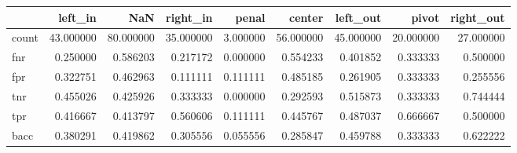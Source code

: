 \begin{tabular}{lrrrrrrrr}
\toprule
{} &    left\_in &        NaN &   right\_in &     penal &     center &   left\_out &      pivot &  right\_out \\
\midrule
count &  43.000000 &  80.000000 &  35.000000 &  3.000000 &  56.000000 &  45.000000 &  20.000000 &  27.000000 \\
fnr   &   0.250000 &   0.586203 &   0.217172 &  0.000000 &   0.554233 &   0.401852 &   0.333333 &   0.500000 \\
fpr   &   0.322751 &   0.462963 &   0.111111 &  0.111111 &   0.485185 &   0.261905 &   0.333333 &   0.255556 \\
tnr   &   0.455026 &   0.425926 &   0.333333 &  0.000000 &   0.292593 &   0.515873 &   0.333333 &   0.744444 \\
tpr   &   0.416667 &   0.413797 &   0.560606 &  0.111111 &   0.445767 &   0.487037 &   0.666667 &   0.500000 \\
bacc  &   0.380291 &   0.419862 &   0.305556 &  0.055556 &   0.285847 &   0.459788 &   0.333333 &   0.622222 \\
\bottomrule
\end{tabular}
